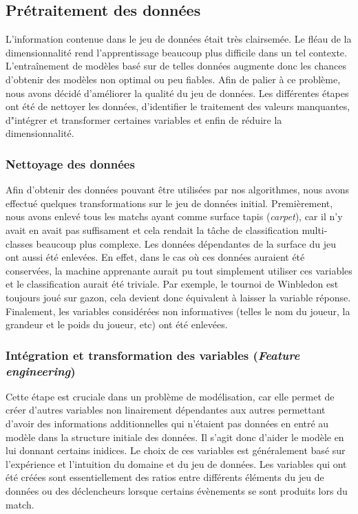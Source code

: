 \subsection{Prétraitement des données}
L'information contenue dans le jeu de données était très clairsemée. Le fléau de la dimensionnalité rend l'apprentissage beaucoup plus difficile dans un tel contexte. L'entraînement de modèles basé sur de telles données augmente donc les chances d'obtenir des modèles non optimal ou peu fiables. Afin de palier à ce problème, nous avons décidé d'améliorer la qualité du jeu de données. Les différentes étapes ont été de nettoyer les données, d'identifier le traitement des valeurs manquantes, d"intégrer et transformer certaines variables et enfin de réduire la dimensionnalité.\\

\subsubsection{Nettoyage des données}
Afin d'obtenir des données pouvant être utilisées par nos algorithmes, nous avons effectué quelques transformations sur le jeu de données initial. Premièrement, nous avons enlevé tous les matchs ayant comme surface tapis (\textit{carpet}), car il n'y avait en avait pas suffisament et cela rendait la tâche de classification multi-classes beaucoup plus complexe. Les données dépendantes de la surface du jeu ont aussi été enlevées. En effet, dans le cas où ces données auraient été conservées, la machine apprenante aurait pu tout simplement utiliser ces variables et le classification aurait été triviale. Par exemple, le tournoi de Winbledon est toujours joué sur gazon, cela devient donc équivalent à laisser la variable réponse. Finalement, les variables considérées non informatives (telles le nom du joueur, la grandeur et le poids du joueur, etc) ont été enlevées.

\subsubsection{Intégration et transformation des variables (\textit{Feature engineering})}
Cette étape est cruciale dans un problème de modélisation, car elle permet de créer d'autres variables non linairement dépendantes aux autres permettant d'avoir des informations additionnelles qui n'étaient pas données en entré au modèle dans la structure initiale des données. Il s'agit donc d'aider le modèle en lui donnant certains inidices. Le choix de ces variables est généralement basé sur l'expérience et l'intuition du domaine et du jeu de données. Les variables qui ont été créées sont essentiellement des ratios entre différents éléments du jeu de données ou des déclencheurs lorsque certains évènements se sont produits lors du match.

